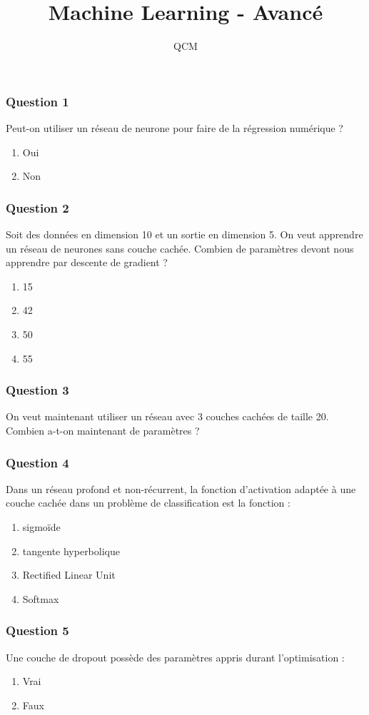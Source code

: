 \documentclass{formation}
\title{Machine Learning - Avancé}
\subtitle{QCM}
\begin{document}
\maketitle

\begin{frame}
  \frametitle{Question 1}
  Peut-on utiliser un réseau de neurone pour faire de la régression numérique ?
  \begin{enumerate}
  \item Oui
  \item Non
  \end{enumerate}
\end{frame}

\begin{frame}
  \frametitle{Question 2}
  Soit des données en dimension 10 et un sortie en dimension 5. On veut apprendre un réseau de neurones sans couche cachée. Combien de paramètres devont nous apprendre par descente de gradient ?
  \begin{enumerate}
  \item 15
  \item 42
  \item 50
  \item 55
  \end{enumerate}
\end{frame}

\begin{frame}
  \frametitle{Question 3}
  On veut maintenant utiliser un réseau avec 3 couches cachées de taille 20. Combien a-t-on maintenant de paramètres ?
\end{frame}

\begin{frame}
  \frametitle{Question 4}
  Dans un réseau profond et non-récurrent, la fonction d'activation adaptée à une couche cachée dans un problème de classification est la fonction :
  \begin{enumerate}
  \item sigmoïde
  \item tangente hyperbolique
  \item Rectified Linear Unit
  \item Softmax
  \end{enumerate}
\end{frame}

\begin{frame}
  \frametitle{Question 5}
  Une couche de dropout possède des paramètres appris durant l'optimisation :
  \begin{enumerate}
  \item Vrai
  \item Faux
  \end{enumerate}
\end{frame}
\end{document}
